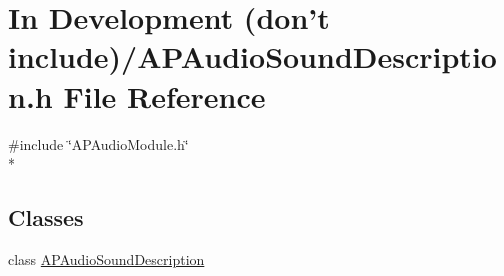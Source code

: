 \hypertarget{_in_01_development_01_07don't_01include_08_2_a_p_audio_sound_description_8h}{\section{In Development (don't include)/\+A\+P\+Audio\+Sound\+Description.h File Reference}
\label{_in_01_development_01_07don't_01include_08_2_a_p_audio_sound_description_8h}
}
{\ttfamily \#include \char`\"{}A\+P\+Audio\+Module.\+h\char`\"{}}\\*
\subsection*{Classes}
\begin{DoxyCompactItemize}
\item 
class \hyperlink{class_a_p_audio_sound_description}{A\+P\+Audio\+Sound\+Description}
\end{DoxyCompactItemize}

